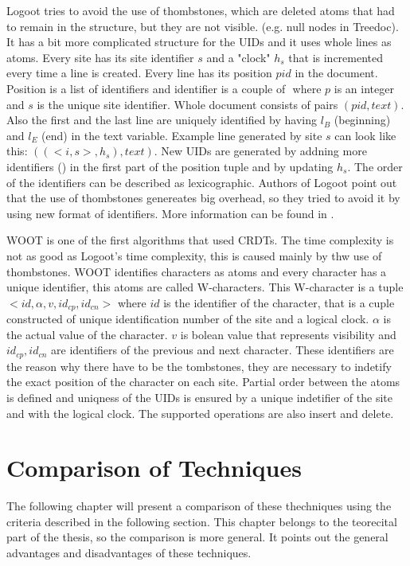 \documentclass[12pt,oneside]{fithesis2}
\begin{document}
\par Logoot tries to avoid the use of thombstones, which are deleted atoms that had to remain in the structure, but they are not visible. (e.g. null nodes in Treedoc). It has a bit more complicated structure for the UIDs and it uses whole lines as atoms. Every site has its site identifier \(s\) and a "clock" \(h_s\) that is incremented every time a line is created. Every line has its position \(pid\) in the document. Position is a list of identifiers and identifier is a couple of \(<p,s>\) where \(p\) is an integer and \(s\) is the unique site identifier. Whole document consists of pairs \((pid,text)\). Also the first and the last line are uniquely identified by having \(l_B\) (beginning) and \(l_E\) (end) in the text variable. Example line generated by site \(s\) can look like this: \( ((<i,s>,h_s),text) \). New UIDs are generated by addning more identifiers (\(<i,s>\)) in the first part of the position tuple and by updating \(h_s\). The order of the identifiers can be described as lexicographic. Authors of Logoot point out that the use of thombstones genereates big overhead, so they tried to avoid it by using new format of identifiers. More information can be found in \cite{Logoot}.
\par WOOT is one of the first algorithms that used CRDTs. The time complexity is not as good as Logoot's time complexity, this is caused mainly by thw use of thombstones. WOOT identifies characters as atoms and every character has a unique identifier, this atoms are called W-characters. This W-character is a tuple \( <id,\alpha,v,id_{cp},id_{cn}> \) where \(id\) is the identifier of the character, that is a cuple constructed of unique identification number of the site and a logical clock. \(\alpha\) is the actual value of the character. \(v\) is bolean value that represents visibility and \( id_{cp}, id_{cn} \) are identifiers of the previous and next character. These identifiers are the reason why there have to be the tombstones, they are necessary to indetify the exact position of the character on each site. Partial order between the atoms is defined and uniqness of the UIDs is ensured by a unique indetifier of the site and with the logical clock. The supported operations are also insert and delete. 
\chapter{Comparison of Techniques}
The following chapter will present a comparison of these thechniques using the criteria described in the following section. This chapter belongs to the teorecital part of the thesis, so the comparison is more general. It points out the general advantages and disadvantages of these techniques. 
\end{document}
